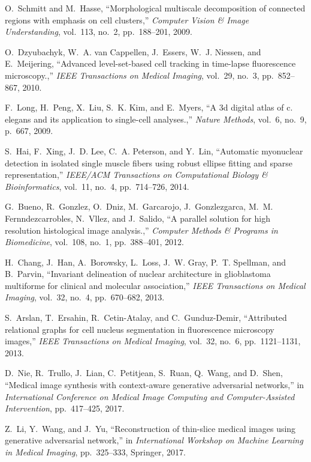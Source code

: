 \documentclass[journal]{IEEEtran}
\begin{document}
\begin{thebibliography}{10}
O.~Schmitt and M.~Hasse, ``Morphological multiscale decomposition of connected
  regions with emphasis on cell clusters,'' {\em Computer Vision \& Image
  Understanding}, vol.~113, no.~2, pp.~188--201, 2009.

O.~Dzyubachyk, W.~A. van Cappellen, J.~Essers, W.~J. Niessen, and E.~Meijering,
  ``Advanced level-set-based cell tracking in time-lapse fluorescence
  microscopy.,'' {\em IEEE Transactions on Medical Imaging}, vol.~29, no.~3,
  pp.~852--867, 2010.

F.~Long, H.~Peng, X.~Liu, S.~K. Kim, and E.~Myers, ``A 3d digital atlas of c.
  elegans and its application to single-cell analyses.,'' {\em Nature Methods},
  vol.~6, no.~9, p.~667, 2009.

S.~Hai, F.~Xing, J.~D. Lee, C.~A. Peterson, and Y.~Lin, ``Automatic myonuclear
  detection in isolated single muscle fibers using robust ellipse fitting and
  sparse representation,'' {\em IEEE/ACM Transactions on Computational Biology
  \& Bioinformatics}, vol.~11, no.~4, pp.~714--726, 2014.

G.~Bueno, R.~Gonzlez, O.~Dniz, M.~Garcarojo, J.~Gonzlezgarca, M.~M.
  Fernndezcarrobles, N.~Vllez, and J.~Salido, ``A parallel solution for
  high resolution histological image analysis.,'' {\em Computer Methods \&
  Programs in Biomedicine}, vol.~108, no.~1, pp.~388--401, 2012.

H.~Chang, J.~Han, A.~Borowsky, L.~Loss, J.~W. Gray, P.~T. Spellman, and
  B.~Parvin, ``Invariant delineation of nuclear architecture in glioblastoma
  multiforme for clinical and molecular association,'' {\em IEEE Transactions
  on Medical Imaging}, vol.~32, no.~4, pp.~670--682, 2013.

S.~Arslan, T.~Ersahin, R.~Cetin-Atalay, and C.~Gunduz-Demir, ``Attributed
  relational graphs for cell nucleus segmentation in fluorescence microscopy
  images,'' {\em IEEE Transactions on Medical Imaging}, vol.~32, no.~6,
  pp.~1121--1131, 2013.

D.~Nie, R.~Trullo, J.~Lian, C.~Petitjean, S.~Ruan, Q.~Wang, and D.~Shen,
  ``Medical image synthesis with context-aware generative adversarial
  networks,'' in {\em International Conference on Medical Image Computing and
  Computer-Assisted Intervention}, pp.~417--425, 2017.

Z.~Li, Y.~Wang, and J.~Yu, ``Reconstruction of thin-slice medical images using
  generative adversarial network,'' in {\em International Workshop on Machine
  Learning in Medical Imaging}, pp.~325--333, Springer, 2017.


\end{thebibliography}
\end{document}
